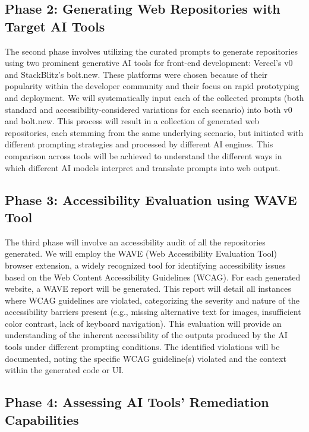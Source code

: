 \documentclass{article}
\begin{document}
\subsection{Phase 2: Generating Web Repositories with Target AI Tools}

The second phase involves utilizing the curated prompts to generate repositories using two prominent generative AI tools for front-end development: Vercel's v0 and StackBlitz's bolt.new. These platforms were chosen because of their popularity within the developer community and their focus on rapid prototyping and deployment. We will systematically input each of the collected prompts (both standard and accessibility-considered variations for each scenario) into both v0 and bolt.new. This process will result in a collection of generated web repositories, each stemming from the same underlying scenario, but initiated with different prompting strategies and processed by different AI engines. This comparison across tools will be achieved to understand the different ways in which different AI models interpret and translate prompts into web output.

\subsection{Phase 3: Accessibility Evaluation using WAVE Tool}

The third phase will involve an accessibility audit of all the repositories generated. We will employ the WAVE (Web Accessibility Evaluation Tool) browser extension, a widely recognized tool for identifying accessibility issues based on the Web Content Accessibility Guidelines (WCAG). For each generated website, a WAVE report will be generated. This report will detail all instances where WCAG guidelines are violated, categorizing the severity and nature of the accessibility barriers present (e.g., missing alternative text for images, insufficient color contrast, lack of keyboard navigation). This evaluation will provide an understanding of the inherent accessibility of the outputs produced by the AI tools under different prompting conditions. The identified violations will be documented, noting the specific WCAG guideline(s) violated and the context within the generated code or UI.

\subsection{Phase 4: Assessing AI Tools' Remediation Capabilities}
\end{document}
